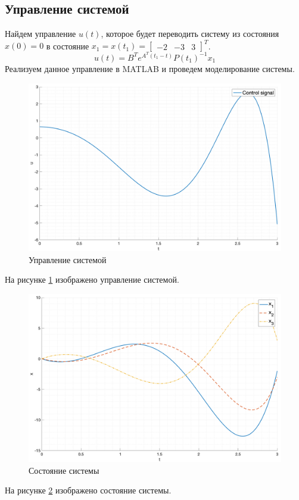 \subsection{Управление системой}
Найдем управление $u(t)$, которое будет переводить систему из состояния $x(0) = 0$ в состояние $x_1 = x(t_1) = \begin{bmatrix} -2 & -3 & 3 \end{bmatrix}^T$. 
\begin{equation}
    u(t) = B^Te^{A^T(t_1 - t)}P(t_1)^{-1}x_1
\end{equation}
Реализуем данное управление в MATLAB и проведем моделирование системы. 
\begin{figure}
    \centering
    \includegraphics[width=\textwidth]{media/plots/task1_control_signal.png}
    \caption{Управление системой}
    \label{fig:task1_control_signal}
\end{figure}
На рисунке \ref{fig:task1_control_signal} изображено управление системой.
\begin{figure}
    \centering
    \includegraphics[width=\textwidth]{media/plots/task1_states.png}
    \caption{Состояние системы}
    \label{fig:task1_state}
\end{figure}
На рисунке \ref{fig:task1_state} изображено состояние системы.

